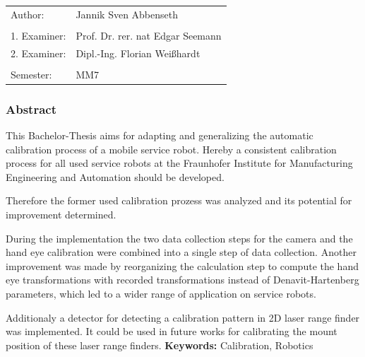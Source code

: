 \begin{tabular}{ll}

  Author:&Jannik Sven Abbenseth\\\\
  1. Examiner:&Prof. Dr. rer. nat Edgar Seemann\\
  2. Examiner:&Dipl.-Ing. Florian Weißhardt \\\\
  Semester:& MM7
\end{tabular}
\subsubsection{Abstract}
\label{ssub:abstract}

This Bachelor-Thesis aims for adapting and generalizing the automatic 
calibration process of a mobile service robot.
Hereby a consistent calibration process for all used service robots at the
Fraunhofer Institute for Manufacturing Engineering and Automation should be developed.

Therefore the former used calibration prozess was analyzed and its potential for
improvement determined.

During the implementation the two data collection steps for the camera and the
hand eye calibration were combined into a single step of data collection.
Another improvement was made by reorganizing the calculation step to compute 
the hand eye transformations with recorded transformations instead of Denavit-Hartenberg
parameters, which led to a wider range of application on service robots.

Additionaly a detector for detecting a calibration pattern in 2D laser range finder
was implemented. It could be used in future works for calibrating the mount position
of these laser range finders.
\vfill
\textbf{Keywords: }Calibration, Robotics



\tableofcontents

\listoffigures



%
%
